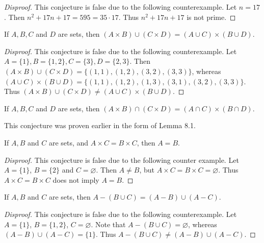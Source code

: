 \documentclass{exam}
\begin{document}
\begin{proof}[Disproof]
    This conjecture is false due to the following counterexample. Let $n = 17$. Then $n^2+17n+17 =595 =35\cdot17$. Thus $n^2+17n+17$ is not prime.
\end{proof}

\begin{conjecture}{9.5}
    If $A,B,C$ and $D$ are sets, then $(A\times B)\cup(C\times D)=(A\cup C)\times(B\cup D)$.
\end{conjecture}

\begin{proof}[Disproof]
    This conjecture is false due to the following counterexample. Let $A=\{1\},B=\{1, 2\}, C=\{3\}, D =\{2, 3\}$. Then $(A\times B)\cup(C\times D)=\{(1, 1), (1, 2), (3, 2), (3, 3)\}$, whereas $(A\cup C)\times(B\cup D) = \{(1, 1), (1, 2), (1, 3), (3, 1), (3, 2), (3, 3)\}$. Thus $(A\times B)\cup(C\times D)\neq(A\cup C)\times(B\cup D)$.
\end{proof}

\begin{conjecture}{9.6}
    If $A, B, C$ and $D$ are sets, then $(A\times B)\cap(C\times D)=(A\cap C)\times(B\cap D)$.
\end{conjecture}

This conjecture was proven earlier in the form of Lemma 8.1.

\begin{conjecture}{9.7}
    If $A, B$ and $C$ are sets, and $A\times C=B\times C$, then $A=B$.
\end{conjecture}

\begin{proof}[Disproof]
    This conjecture is false due to the following counter example. Let $A=\{1\}$, $B=\{2\}$ and $C=\varnothing$. Then $A\neq B$, but $A\times C=B\times C=\varnothing$. Thus $A\times C=B\times C$ does not imply $A=B$.
\end{proof}

\begin{conjecture}{9.8}
    If $A, B$ and $C$ are sets, then $A-(B\cup C)=(A-B)\cup(A-C)$.
\end{conjecture}

\begin{proof}[Disproof]
    This conjecture is false due to the following counterexample. Let $A = \{1\}$, $B= \{1, 2\}$, $C=\varnothing$. Note that $A-(B\cup C) = \varnothing$, whereas $(A-B)\cup(A-C) = \{1\}$. Thus $A-(B\cup C)\neq(A-B)\cup(A-C)$.
\end{proof}
\end{document}
